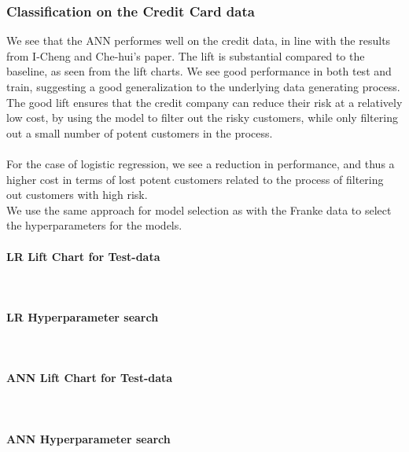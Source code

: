\documentclass[10pt, a4paper, twocolumn]{article}
\newcommand{\myparagraph}[1]{\paragraph{#1}\mbox{}\\}
\begin{document}
		\subsubsection{Classification on the Credit Card data}
			We see that the ANN performes well on the credit data, in line with the results from I-Cheng and Che-hui's paper\cite{ScientificArticle}. The lift is substantial compared to the baseline, as seen from the lift charts. We see good performance in both test and train, suggesting a good generalization to the underlying data generating process. The good lift ensures that the credit company can reduce their risk at a relatively low cost, by using the model to filter out the risky customers, while only filtering out a small number of potent customers in the process.\\\\
			For the case of logistic regression, we see a reduction in performance, and thus a higher cost in terms of lost potent customers related to the process of filtering out customers with high risk.\\
			We use the same approach for model selection as with the Franke data to select the hyperparameters for the models.
			\myparagraph{LR Lift Chart for Test-data}
			\myparagraph{LR Hyperparameter search}
			\myparagraph{ANN Lift Chart for Test-data}
			\myparagraph{ANN Hyperparameter search}
\end{document}
